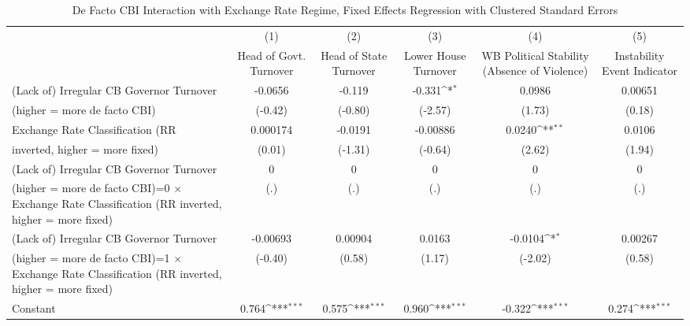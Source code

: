 \begin{table}[htbp]\centering
\def\sym#1{\ifmmode^{#1}\else\(^{#1}\)\fi}
\caption{De Facto CBI Interaction with Exchange Rate Regime, Fixed Effects Regression with Clustered Standard Errors \label{imultIndFEDF}}
\begin{tabular}{l*{5}{c}}
\toprule
                                        &\multicolumn{1}{c}{(1)}&\multicolumn{1}{c}{(2)}&\multicolumn{1}{c}{(3)}&\multicolumn{1}{c}{(4)}&\multicolumn{1}{c}{(5)}\\
                                        &\multicolumn{1}{c}{Head of Govt. Turnover}&\multicolumn{1}{c}{Head of State Turnover}&\multicolumn{1}{c}{Lower House Turnover}&\multicolumn{1}{c}{WB Political Stability (Absence of Violence)}&\multicolumn{1}{c}{Instability Event Indicator}\\
\midrule
(Lack of) Irregular CB Governor Turnover&   -0.0656         &    -0.119         &    -0.331\sym{*}  &    0.0986         &   0.00651         \\
(higher = more de facto CBI)            &   (-0.42)         &   (-0.80)         &   (-2.57)         &    (1.73)         &    (0.18)         \\
\addlinespace
Exchange Rate Classification (RR        &  0.000174         &   -0.0191         &  -0.00886         &    0.0240\sym{**} &    0.0106         \\
inverted, higher = more fixed)          &    (0.01)         &   (-1.31)         &   (-0.64)         &    (2.62)         &    (1.94)         \\
\addlinespace
(Lack of) Irregular CB Governor Turnover&         0         &         0         &         0         &         0         &         0         \\
(higher = more de facto CBI)=0 $\times$ Exchange Rate Classification (RR inverted, higher = more fixed)&       (.)         &       (.)         &       (.)         &       (.)         &       (.)         \\
\addlinespace
(Lack of) Irregular CB Governor Turnover&  -0.00693         &   0.00904         &    0.0163         &   -0.0104\sym{*}  &   0.00267         \\
(higher = more de facto CBI)=1 $\times$ Exchange Rate Classification (RR inverted, higher = more fixed)&   (-0.40)         &    (0.58)         &    (1.17)         &   (-2.02)         &    (0.58)         \\
\addlinespace
Constant                                &     0.764\sym{***}&     0.575\sym{***}&     0.960\sym{***}&    -0.322\sym{***}&     0.274\sym{***}\\

\end{tabular}
\end{table}
